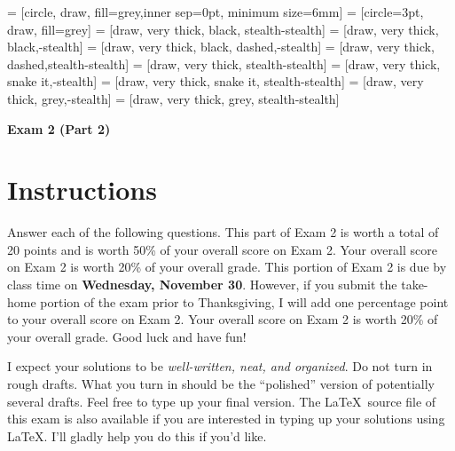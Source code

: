 \documentclass[11pt]{article}
\theoremstyle{definition}
\begin{document}
 = [circle, draw, fill=grey,inner sep=0pt, minimum size=6mm]
 = [circle=3pt, draw, fill=grey]
 = [draw, very  thick, black, stealth-stealth]
 = [draw, very  thick, black,-stealth]
 = [draw, very  thick, black, dashed,-stealth]
 = [draw, very thick, dashed,stealth-stealth]
 = [draw, very thick, stealth-stealth]
 = [draw, very thick, snake it,-stealth]
 = [draw, very thick, snake it, stealth-stealth]
 = [draw, very thick, grey,-stealth]
 = [draw, very thick, grey, stealth-stealth]

\begin{center}

{\Large\bf Exam 2 (Part 2)}

\bigskip

  
  \bigskip
  

\end{center}

\section*{Instructions}

Answer each of the following questions. This part of Exam 2 is worth a total of 20 points and is worth 50\% of your overall score on Exam 2. Your overall score on Exam 2 is worth 20\% of your overall grade. This portion of Exam 2 is due by class time on \textbf{Wednesday, November 30}. However, if you submit the take-home portion of the exam prior to Thanksgiving, I will add one percentage point to your overall score on Exam 2. Your overall score on Exam 2 is worth 20\% of your overall grade. Good luck and have fun!

\bigskip

I expect your solutions to be \emph{well-written, neat, and organized}.  Do not turn in rough drafts.  What you turn in should be the ``polished'' version of potentially several drafts.  Feel free to type up your final version.  The \LaTeX\ source file of this exam is also available if you are interested in typing up your solutions using \LaTeX.  I'll gladly help you do this if you'd like.
\end{document}
